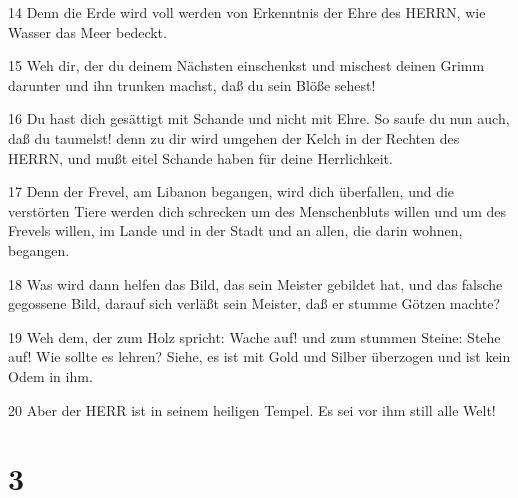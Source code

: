\par 14 Denn die Erde wird voll werden von Erkenntnis der Ehre des HERRN, wie Wasser das Meer bedeckt.
\par 15 Weh dir, der du deinem Nächsten einschenkst und mischest deinen Grimm darunter und ihn trunken machst, daß du sein Blöße sehest!
\par 16 Du hast dich gesättigt mit Schande und nicht mit Ehre. So saufe du nun auch, daß du taumelst! denn zu dir wird umgehen der Kelch in der Rechten des HERRN, und mußt eitel Schande haben für deine Herrlichkeit.
\par 17 Denn der Frevel, am Libanon begangen, wird dich überfallen, und die verstörten Tiere werden dich schrecken um des Menschenbluts willen und um des Frevels willen, im Lande und in der Stadt und an allen, die darin wohnen, begangen.
\par 18 Was wird dann helfen das Bild, das sein Meister gebildet hat, und das falsche gegossene Bild, darauf sich verläßt sein Meister, daß er stumme Götzen machte?
\par 19 Weh dem, der zum Holz spricht: Wache auf! und zum stummen Steine: Stehe auf! Wie sollte es lehren? Siehe, es ist mit Gold und Silber überzogen und ist kein Odem in ihm.
\par 20 Aber der HERR ist in seinem heiligen Tempel. Es sei vor ihm still alle Welt!

\chapter{3}

